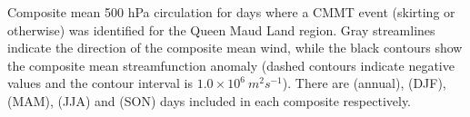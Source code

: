 \label{fig:queen_maud}
Composite mean 500 hPa circulation for days where a CMMT event (skirting or otherwise) was identified for the Queen Maud Land region. Gray streamlines indicate the direction of the composite mean wind, while the black contours show the composite mean streamfunction anomaly (dashed contours indicate negative values and the contour interval is $1.0 \times 10^6 \: m^2 s^{-1}$). There are (annual),  (DJF),  (MAM),  (JJA) and  (SON) days included in each composite respectively.